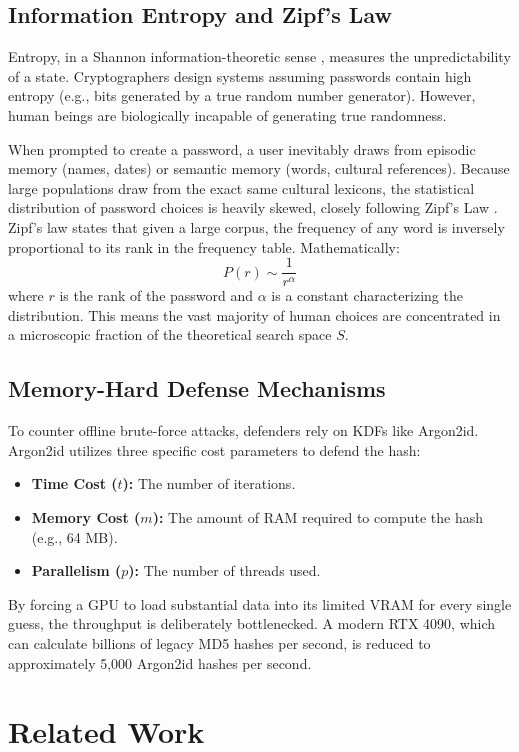 \documentclass[conference]{IEEEtran}
\begin{document}
\subsection{Information Entropy and Zipf's Law}
Entropy, in a Shannon information-theoretic sense \cite{shannon1948}, measures the unpredictability of a state. Cryptographers design systems assuming passwords contain high entropy (e.g., bits generated by a true random number generator). However, human beings are biologically incapable of generating true randomness. 

When prompted to create a password, a user inevitably draws from episodic memory (names, dates) or semantic memory (words, cultural references). Because large populations draw from the exact same cultural lexicons, the statistical distribution of password choices is heavily skewed, closely following Zipf's Law \cite{zipf1949}. Zipf's law states that given a large corpus, the frequency of any word is inversely proportional to its rank in the frequency table. Mathematically:
\begin{equation}
P(r) \sim \frac{1}{r^\alpha}
\end{equation}
where $r$ is the rank of the password and $\alpha$ is a constant characterizing the distribution. This means the vast majority of human choices are concentrated in a microscopic fraction of the theoretical search space $S$.

\subsection{Memory-Hard Defense Mechanisms}
To counter offline brute-force attacks, defenders rely on KDFs like Argon2id. Argon2id utilizes three specific cost parameters to defend the hash:
\begin{itemize}
    \item \textbf{Time Cost ($t$):} The number of iterations.
    \item \textbf{Memory Cost ($m$):} The amount of RAM required to compute the hash (e.g., 64 MB).
    \item \textbf{Parallelism ($p$):} The number of threads used.
\end{itemize}
By forcing a GPU to load substantial data into its limited VRAM for every single guess, the throughput is deliberately bottlenecked. A modern RTX 4090, which can calculate billions of legacy MD5 hashes per second, is reduced to approximately 5,000 Argon2id hashes per second.

\section{Related Work}
\end{document}

